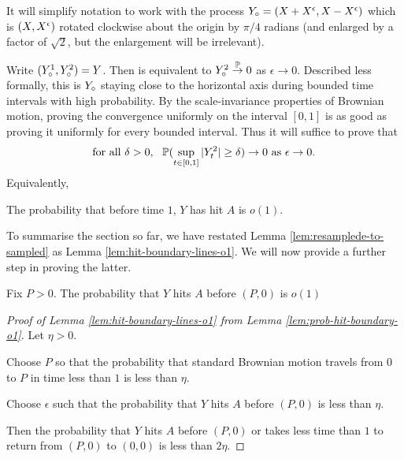 {It will simplify notation to work with the process $\rotproc =
(\sampled + \resamplede, \sampled - \resamplede)$ which is $(\sampled,
\resamplede)$ rotated clockwise about the origin by $\pi / 4$ radians (and enlarged by a factor of
$\sqrt{2}$, but the enlargement will be irrelevant).

Write $(\rotproc^1, \rotproc^2) = Y$.
Then \statementoflemresampledetosampled{} is equivalent to $\rotproc^2
\toinP 0$ as $\epsilon \to 0$.
Described less formally, this is $\rotproc$ staying close to the
horizontal axis during bounded time intervals with high probability.
By the scale-invariance properties of Brownian motion, proving the
convergence uniformly on the interval $[0,1]$ is as good as proving it
uniformly for every bounded interval.  Thus it will suffice to prove that
\[\text{
  for all $\delta > 0$, \, $\P(\sup_{t \in [0,1]} |Y^2_t| \ge \delta) \to 0$ as $\epsilon
  \to 0$.
}\]
\newcommand{\boundarylines}{A}
Equivalently,
\FIXME{}{Introduce $\boundarylines$}

\begin{lemma}
  \label{lem:hit-boundary-lines-o1}
  The probability that before time $1$, $Y$ has hit $\boundarylines$
  is $o(1)$.
\end{lemma}

To summarise the section so far, we have restated Lemma
\ref{lem:resamplede-to-sampled}
as Lemma
\ref{lem:hit-boundary-lines-o1}.  We will now provide a further step
in proving the latter.

\newcommand{\farpoint}{(P,0)}
\newcommand{\probhitboundaryis}[1]{Fix $P > 0$.  The probability that $Y$
  hits $\boundarylines$ before $\farpoint$ is #1}

\begin{lemma}
  \label{lem:prob-hit-boundary-o1}
  \probhitboundaryis{$o(1)$}
\end{lemma}

\newcommand{\origin}{(0,0)}

\begin{proof}[Proof of Lemma \ref{lem:hit-boundary-lines-o1} from
    Lemma \ref{lem:prob-hit-boundary-o1}]
  Let $\eta > 0$.

  Choose $P$ so that the probability that standard Brownian motion
  travels from $0$ to $P$ in time less than $1$ is less than
  $\eta$.

  Choose $\epsilon$ such that the probability that $Y$ hits
  $\boundarylines$ before $\farpoint$ is less than $\eta$.

  Then the probability that $Y$ hits $\boundarylines$ before $\farpoint$
  or takes less time than $1$ to return from $\farpoint$ to $\origin$ is
  less than $2\eta$.


\end{proof}}
